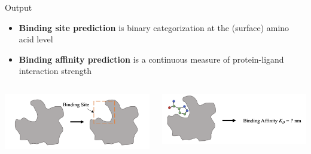 \documentclass{beamer}
\begin{document}
\begin{frame}{Output}
    \begin{itemize}
        \item {\bf Binding site prediction} is binary categorization at the (surface) amino acid level 
        \item {\bf Binding affinity prediction} is a continuous measure of protein-ligand interaction strength 
    \end{itemize}

    \vspace{4mm}

    \begin{columns}
        \begin{column}{0.5\textwidth}
            \includegraphics[width=\textwidth]{Zhang_2023_BindingSite.png}
        \end{column}
        \begin{column}{0.5\textwidth}
            \includegraphics[width=\textwidth]{Zhang_2023_BindingAffinity.png}
        \end{column}
    \end{columns}
\end{frame}
\end{document}

